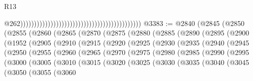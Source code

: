 \begin{lexlean}{R13}
\begin{coremodule}
                                                                                            @262))))))))))))))))))))))))))))))))))))))))))))
@3383 := @2840
    (@2845
      (@2850
        (@2855
          (@2860
            (@2865
              (@2870
                (@2875
                  (@2880
                    (@2885
                      (@2890
                        (@2895
                          (@2900
                            (@1952
                              (@2905
                                (@2910
                                  (@2915
                                    (@2920
                                      (@2925
                                        (@2930
                                          (@2935
                                            (@2940
                                              (@2945
                                                (@2950
                                                  (@2955
                                                    (@2960
                                                      (@2965
                                                        (@2970
                                                          (@2975
                                                            (@2980
                                                              (@2985
                                                                (@2990
                                                                  (@2995
                                                                    (@3000
                                                                      (@3005
                                                                        (@3010
                                                                          (@3015
                                                                            (@3020
                                                                              (@3025
                                                                                (@3030
                                                                                  (@3035
                                                                                    (@3040
                                                                                      (@3045
                                                                                        (@3050
                                                                                          (@3055
                                                                                            (@3060

\end{coremodule}
\end{lexlean}
